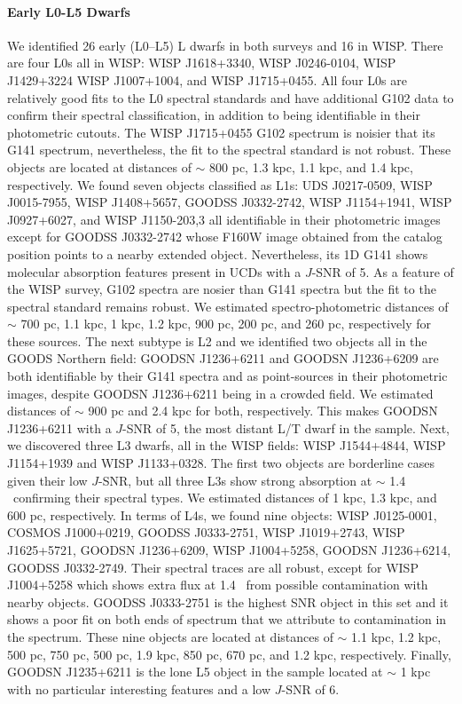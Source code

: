 \documentclass[manuscript]{aastex63}
\begin{document}
\paragraph{Early L0-L5 Dwarfs}
We identified 26 early (L0--L5) L dwarfs in both surveys and 16 in WISP. There are four L0s all in WISP: WISP J1618+3340, WISP J0246-0104, WISP J1429+3224 WISP J1007+1004, and WISP J1715+0455. All four L0s are relatively good fits to the L0 spectral standards and have additional G102 data to confirm their spectral classification, in addition to being identifiable in their photometric cutouts. The WISP J1715+0455 G102 spectrum is noisier that its G141 spectrum, nevertheless, the fit to the spectral standard is not robust. These objects are located at distances of $\sim$ 800 pc, 1.3 kpc, 1.1 kpc, and 1.4 kpc, respectively. We found seven objects classified as L1s: UDS J0217-0509, WISP J0015-7955, WISP J1408+5657, GOODSS J0332-2742, WISP J1154+1941, WISP J0927+6027, and WISP J1150-203,3 all identifiable in their photometric images except for GOODSS J0332-2742 whose F160W image obtained from the catalog position points to a nearby extended object. Nevertheless, its 1D G141 shows molecular absorption features present in UCDs with a $J$-SNR of 5. As a feature of the WISP survey, G102 spectra are nosier than G141 spectra but the fit to the spectral standard remains robust. We estimated spectro-photometric distances of $\sim$ 700 pc, 1.1 kpc, 1 kpc, 1.2 kpc, 900 pc, 200 pc, and 260 pc, respectively for these sources. The next subtype is L2 and we identified two objects all in the GOODS Northern field: GOODSN J1236+6211 and GOODSN J1236+6209 are both identifiable by their G141 spectra and as point-sources in their photometric images, despite GOODSN J1236+6211 being in a crowded field. We estimated distances of $\sim$ 900 pc and 2.4 kpc for both, respectively. This makes GOODSN J1236+6211 with a $J$-SNR of 5, the most distant L/T dwarf in the sample. Next, we discovered three L3 dwarfs, all in the WISP fields: WISP J1544+4844, WISP J1154+1939 and WISP J1133+0328. The first two objects are borderline cases given their low $J$-SNR, but all three L3s show strong \wat absorption at $\sim$ 1.4 \micron\ confirming their spectral types. We estimated distances of 1 kpc, 1.3 kpc, and 600 pc, respectively. In terms of L4s, we found nine objects: WISP J0125-0001, COSMOS J1000+0219, GOODSS J0333-2751, WISP J1019+2743, WISP J1625+5721, GOODSN J1236+6209, WISP J1004+5258, GOODSN J1236+6214, GOODSS J0332-2749. Their spectral traces are all robust, except for WISP J1004+5258 which shows extra flux at 1.4 \micron\ from possible contamination with nearby objects. GOODSS J0333-2751 is the highest SNR object in this set and it shows a poor fit on both ends of spectrum that we attribute to contamination in the spectrum. These nine objects are located at distances of $\sim$ 1.1 kpc, 1.2 kpc, 500 pc, 750 pc, 500 pc, 1.9 kpc, 850 pc, 670 pc, and 1.2 kpc, respectively. Finally, GOODSN J1235+6211 is the lone L5 object in the sample located at $\sim$ 1 kpc with no particular interesting features and a low $J$-SNR of 6.
\end{document}

